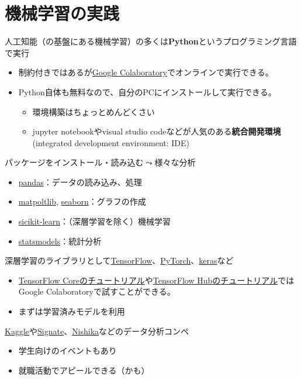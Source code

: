 \documentclass[
  xelatex,
  ja=standard]{bxjsarticle}
\providecommand{\tightlist}{%
  \setlength{\itemsep}{0pt}\setlength{\parskip}{0pt}}\usepackage{longtable,booktabs,array}
\begin{document}
\hypertarget{ux6a5fux68b0ux5b66ux7fd2ux306eux5b9fux8df5}{%
\section{機械学習の実践}\label{ux6a5fux68b0ux5b66ux7fd2ux306eux5b9fux8df5}}

人工知能（の基盤にある機械学習）の多くは\textbf{Python}というプログラミング言語で実行

\begin{itemize}
\tightlist
\item
  制約付きではあるが\href{https://colab.research.google.com/}{Google
  Colaboratory}でオンラインで実行できる。
\item
  Python自体も無料なので、自分のPCにインストールして実行できる。

  \begin{itemize}
  \tightlist
  \item
    環境構築はちょっとめんどくさい
  \item
    jupyter notebookやvisual studio
    codeなどが人気のある\textbf{統合開発環境} (integrated development
    environment: IDE)
  \end{itemize}
\end{itemize}

パッケージをインストール・読み込む\(\leadsto\)様々な分析

\begin{itemize}
\tightlist
\item
  \href{https://pandas.pydata.org/}{pandas}：データの読み込み、処理
\item
  \href{https://matplotlib.org/}{matpoltlib},
  \href{https://seaborn.pydata.org/}{seaborn}：グラフの作成
\item
  \href{https://scikit-learn.org/stable/}{sicikit-learn}：（深層学習を除く）機械学習
\item
  \href{https://www.statsmodels.org/stable/}{statsmodels}：統計分析
\end{itemize}

深層学習のライブラリとして\href{https://www.tensorflow.org/}{TensorFlow}、\href{https://pytorch.org/}{PyTorch}、\href{https://keras.io/ja/}{keras}など

\begin{itemize}
\tightlist
\item
  \href{https://www.tensorflow.org/tutorials}{TensorFlow
  Coreのチュートリアル}や\href{https://www.tensorflow.org/hub/tutorials}{TensorFlow
  Hubのチュートリアル}ではGoogle Colaboratoryで試すことができる。
\item
  まずは学習済みモデルを利用
\end{itemize}

\href{https://www.kaggle.com/}{Kaggle}や\href{https://signate.jp/}{Signate}、\href{https://www.nishika.com/}{Nishika}などのデータ分析コンペ

\begin{itemize}
\tightlist
\item
  学生向けのイベントもあり
\item
  就職活動でアピールできる（かも）
\end{itemize}


  
\end{document}
